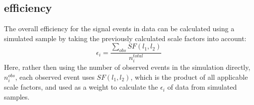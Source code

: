 \subsection{\texorpdfstring{\phistar}{Phistar} efficiency}



The overall efficiency for the signal events in data can be calculated using a simulated sample by taking the previously calculated scale factors into account:
\begin{equation}
   \epsilon_i
   =
   \frac{\sum\limits_{obs}SF(l_1,l_2)}{n_i^{total}}
\end{equation}
Here, rather then using the number of observed events in the simulation directly, $n_i^{obs}$, each observed event uses $SF(l_1,l_2)$, which is the product of all applicable scale factors, and used as a weight to calculate the $\epsilon_i$ of data from simulated samples. 


